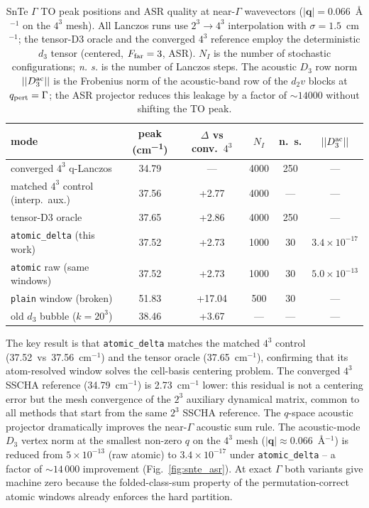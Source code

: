 \documentclass[11pt,a4paper]{article}
\newcommand{\qv}{\mathbf{q}}
\begin{document}
\begin{table}[tb]
\centering
\caption{SnTe $\Gamma$ TO peak positions and ASR quality at near-$\Gamma$
wavevectors ($|\qv|=0.066$~\AA$^{-1}$ on the $4^3$ mesh).
All Lanczos runs use $2^3\to4^3$ interpolation with
$\sigma=1.5$~cm$^{-1}$; the tensor-D3 oracle and the converged $4^3$ reference
employ the deterministic $d_3$ tensor (centered, $F_{\rm far}=3$, ASR).
$N_I$ is the number of stochastic configurations; \textit{n. s.} is the number
of Lanczos steps. The acoustic $D_3$ row norm $||D_3^{\rm ac}||$ is the
Frobenius norm of the acoustic-band row of the $d_2v$ blocks at $q_{\rm
pert}=\Gamma$; the ASR projector reduces this leakage by a factor of
$\sim 14000$ without shifting the TO peak.}
\label{tab:snte_peaks}
\begin{tabular}{lccccc}
\toprule
mode & peak (\si{cm^{-1}}) & $\Delta$ vs conv.\ $4^3$ & $N_I$ & n.\ s. & $||D_3^{\rm ac}||$ \\
\midrule
converged $4^3$ q-Lanczos & 34.79 & --- & 4000 & 250 & --- \\
matched $4^3$ control (interp.\ aux.) & 37.56 & +2.77 & 4000 & --- & --- \\
tensor-D3 oracle & 37.65 & +2.86 & 4000 & 250 & --- \\
\midrule
\texttt{atomic\_delta} (this work) & 37.52 & +2.73 & 1000 & 30 & $3.4\times10^{-17}$ \\
\texttt{atomic} raw (same windows) & 37.52 & +2.73 & 1000 & 30 & $5.0\times10^{-13}$ \\
\texttt{plain} window (broken) & 51.83 & +17.04 & 500 & 30 & --- \\
old $d_3$ bubble ($k\!=\!20^3$) & 38.46 & +3.67 & --- & --- & --- \\
\bottomrule
\end{tabular}
\end{table}

The key result is that \texttt{atomic\_delta} matches the matched $4^3$
control (37.52~vs~37.56~cm$^{-1}$) and the tensor oracle (37.65~cm$^{-1}$),
confirming that its atom-resolved window solves the cell-basis centering
problem.  The converged $4^3$ SSCHA reference (34.79~cm$^{-1}$) is
2.73~cm$^{-1}$ lower: this residual is not a centering error but the mesh
convergence of the $2^3$ auxiliary dynamical matrix, common to all methods
that start from the same $2^3$ SSCHA reference.
The $q$-space acoustic projector dramatically improves the near-$\Gamma$
acoustic sum rule.  The acoustic-mode $D_3$ vertex norm at the smallest
non-zero $q$ on the $4^3$ mesh ($|\qv|\approx 0.066$~\AA$^{-1}$) is reduced
from $5\times10^{-13}$ (raw atomic) to $3.4\times10^{-17}$ under
\texttt{atomic\_delta} -- a factor of $\sim 14\,000$ improvement
(Fig.~\ref{fig:snte_asr}). At exact $\Gamma$ both variants give machine zero
because the folded-class-sum property of the permutation-correct atomic
windows already enforces the hard partition.
\end{document}
